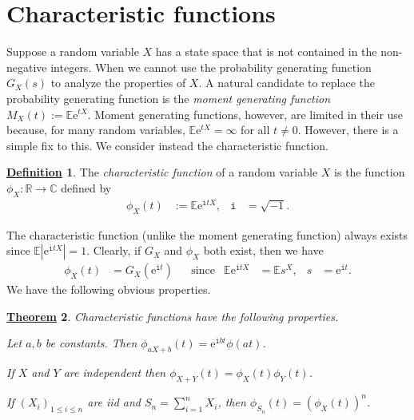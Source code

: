 \documentclass[12pt]{book}
\numberwithin{equation}{chapter}
\theoremstyle{plain}
\newtheorem{theorem}{\underline{Theorem}}
\numberwithin{theorem}{section}
\theoremstyle{definition}
\newtheorem{definition}[theorem]{\underline{Definition}}
\numberwithin{exercise}{chapter}
\newcommand{\<}{\langle}
\renewcommand{\>}{\rangle}
\renewcommand{\(}{\left(}
\renewcommand{\)}{\right)}
\renewcommand{\[}{\left[}
\renewcommand{\]}{\right]}
\newcommand\Cb{\mathds{C}}
\newcommand\Eb{\mathds{E}}
\newcommand\Rb{\mathds{R}}
\newcommand\ii{\mathtt{i}}
\newcommand\ee{\mathrm{e}}
\begin{document}

\section{Characteristic functions}

Suppose a random variable $X$ has a state space that is not contained in the non-negative integers.  When we cannot use the probability generating function $G_X(s)$ to analyze the properties of $X$.  A natural candidate to replace the probability generating function is the \emph{moment generating function} $M_X(t):=\Eb \ee^{t X}$.  Moment generating functions, however, are limited in their use because, for many random variables, $\Eb \ee^{t X}= \infty$ for all $t \neq 0$.  However, there is a simple fix to this.  We consider instead the characteristic function.

\begin{definition}
The \emph{characteristic function} of a random variable $X$ is the function $\phi_X : \Rb \to \Cb$ defined by
\begin{align}
\phi_X(t)
	&:=	\Eb \ee^{\ii t X} , &
\ii
	&=	\sqrt{-1} .
\end{align}
\end{definition}  

\noindent
The characteristic function (unlike the moment generating function) always exists since $\Eb |\ee^{\ii t X } | = 1$.  
Clearly, if $G_X$ and $\phi_X$ both exist, then we have
\begin{align}
\phi_X(t) 
	&=	G_X(\ee^{\ii t}) &
	&\text{since}&
\Eb \ee^{\ii t X}
	&=	\Eb s^X , &
s
	&=	\ee^{\ii t} .
\end{align}
We have the following obvious properties.

\begin{theorem}
\label{thm:char.props}
Characteristic functions have the following properties.
\begin{enumerate*}
\item Let $a,b$ be constants.  Then $\phi_{a X + b}(t) = \ee^{\ii b t}\phi(at)$.
\item If $X$ and $Y$ are independent then $\phi_{X+Y}(t) = \phi_X(t)\phi_Y(t)$.
\item If $(X_i)_{1 \leq i \leq n}$ are iid and $S_n = \sum_{i=1}^n X_i$, then $\phi_{S_n}(t) = (\phi_X(t))^n$.
\end{enumerate*}
\end{theorem}
\end{document}
